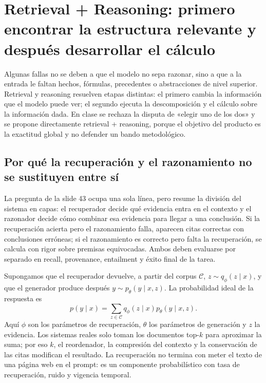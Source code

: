 \section{Retrieval + Reasoning: primero encontrar la estructura relevante y después desarrollar el cálculo}

Algunas fallas no se deben a que el modelo no sepa razonar, sino a que a la entrada le faltan hechos, fórmulas, precedentes o abstracciones de nivel superior. Retrieval y reasoning resuelven etapas distintas: el primero cambia la información que el modelo puede ver; el segundo ejecuta la descomposición y el cálculo sobre la información dada. En clase se rechaza la disputa de «elegir uno de los dos» y se propone directamente retrieval + reasoning, porque el objetivo del producto es la exactitud global y no defender un bando metodológico.

\subsection{Por qué la recuperación y el razonamiento no se sustituyen entre sí}

La pregunta de la slide 43 ocupa una sola línea, pero resume la división del sistema en capas: el recuperador decide qué evidencia entra en el contexto y el razonador decide cómo combinar esa evidencia para llegar a una conclusión. Si la recuperación acierta pero el razonamiento falla, aparecen citas correctas con conclusiones erróneas; si el razonamiento es correcto pero falta la recuperación, se calcula con rigor sobre premisas equivocadas. Ambos deben evaluarse por separado en recall, provenance, entailment y éxito final de la tarea.


Supongamos que el recuperador devuelve, a partir del corpus $\mathcal C$, $z\sim q_\phi(z\mid x)$, y que el generador produce después $y\sim p_\theta(y\mid x,z)$. La probabilidad ideal de la respuesta es
\[
p(y\mid x)=\sum_{z\in\mathcal C}q_\phi(z\mid x)p_\theta(y\mid x,z).
\]
Aquí $\phi$ son los parámetros de recuperación, $\theta$ los parámetros de generación y $z$ la evidencia. Los sistemas reales solo toman los documentos top-$k$ para aproximar la suma; por eso $k$, el reordenador, la compresión del contexto y la conservación de las citas modifican el resultado. La recuperación no termina con meter el texto de una página web en el prompt: es un componente probabilístico con tasa de recuperación, ruido y vigencia temporal.

